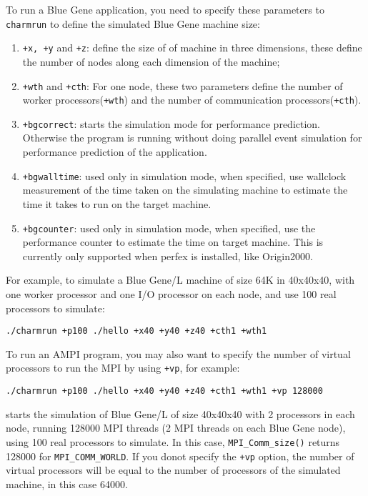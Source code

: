 To run a Blue Gene application, you need to specify these parameters to 
{\tt charmrun} to define the simulated Blue Gene machine size:
\begin{enumerate}
\item {\tt +x, +y} and {\tt +z}:  define the size of of machine in three dimensions, these define the number of nodes along each dimension of the machine;
\item {\tt +wth} and {\tt +cth}:  For one node, these two parameters define the number of worker processors({\tt +wth}) and the number of communication processors({\tt +cth}).
\item {\tt +bgcorrect}: starts the simulation mode for performance prediction. Otherwise the program is running without doing parallel event simulation for performance prediction of the application.
\item {\tt +bgwalltime}: used only in simulation mode, when specified, use wallclock measurement of the time taken on the simulating machine to estimate the time it takes to run on the target machine.
\item {\tt +bgcounter}:  used only in simulation mode, when specified, use the performance counter to estimate the time on target machine. This is currently only supported when perfex is installed, like Origin2000.
\end{enumerate}

For example, to simulate a Blue Gene/L machine of size 64K in 40x40x40, with 
one worker processor and one I/O processor on each node, and use 100 
real processors to simulate:
\begin{verbatim}
./charmrun +p100 ./hello +x40 +y40 +z40 +cth1 +wth1
\end{verbatim}

To run an AMPI program, you may also want to specify the number of virtual 
processors to run the MPI by using {\tt +vp}, for example:
\begin{verbatim}
./charmrun +p100 ./hello +x40 +y40 +z40 +cth1 +wth1 +vp 128000
\end{verbatim}
starts the simulation of Blue Gene/L of size 40x40x40 with 2 processors 
in each node, running 128000 MPI threads (2 MPI threads on each Blue Gene node),
 using 100 real processors to simulate. In this case, {\tt MPI\_Comm\_size()}
returns 128000 for {\tt MPI\_COMM\_WORLD}. If you donot specify the {\tt +vp}
option, the number of virtual processors will be equal to the number of 
processors of the simulated machine, in this case 64000.


